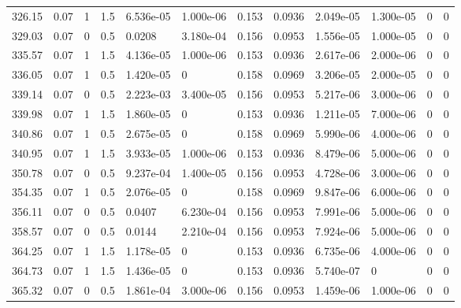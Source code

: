 \documentclass[preview]{standalone}
\begin{document}
{{{\begin{tabular}{L{1.2cm}C{1.2cm} C{0.3cm}C{0.5cm} C{1.4cm}C{1.4cm} C{1.4cm}C{1.4cm} C{1.6cm}C{1.6cm} C{1.6cm}C{1.6cm}}
  326.15  &  0.07  & 1     & 1.5 &  6.536e-05  & 1.000e-06  &  0.153&   0.0936& 2.049e-05 & 1.300e-05   &  0 & 0  \\ 
  329.03  &  0.07  & 0     & 0.5 &  0.0208  & 3.180e-04  &  0.156&   0.0953& 1.556e-05 & 1.000e-05   &  0 & 0  \\ 
  335.57  &  0.07  & 1     & 1.5 &  4.136e-05  & 1.000e-06  &  0.153&   0.0936& 2.617e-06 & 2.000e-06   &  0 & 0  \\ 
  336.05  &  0.07  & 1     & 0.5 &  1.420e-05  & 0  &  0.158&   0.0969& 3.206e-05 & 2.000e-05   &  0 & 0  \\ 
  339.14  &  0.07  & 0     & 0.5 &  2.223e-03  & 3.400e-05  &  0.156&   0.0953& 5.217e-06 & 3.000e-06   &  0 & 0  \\ 
  339.98  &  0.07  & 1     & 1.5 &  1.860e-05  & 0  &  0.153&   0.0936& 1.211e-05 & 7.000e-06   &  0 & 0  \\ 
  340.86  &  0.07  & 1     & 0.5 &  2.675e-05  & 0  &  0.158&   0.0969& 5.990e-06 & 4.000e-06   &  0 & 0  \\ 
  340.95  &  0.07  & 1     & 1.5 &  3.933e-05  & 1.000e-06  &  0.153&   0.0936& 8.479e-06 & 5.000e-06   &  0 & 0  \\ 
  350.78  &  0.07  & 0     & 0.5 &  9.237e-04  & 1.400e-05  &  0.156&   0.0953& 4.728e-06 & 3.000e-06   &  0 & 0  \\ 
  354.35  &  0.07  & 1     & 0.5 &  2.076e-05  & 0  &  0.158&   0.0969& 9.847e-06 & 6.000e-06   &  0 & 0  \\ 
  356.11  &  0.07  & 0     & 0.5 &  0.0407  & 6.230e-04  &  0.156&   0.0953& 7.991e-06 & 5.000e-06   &  0 & 0  \\ 
  358.57  &  0.07  & 0     & 0.5 &  0.0144  & 2.210e-04  &  0.156&   0.0953& 7.924e-06 & 5.000e-06   &  0 & 0  \\ 
  364.25  &  0.07  & 1     & 1.5 &  1.178e-05  & 0  &  0.153&   0.0936& 6.735e-06 & 4.000e-06   &  0 & 0  \\ 
  364.73  &  0.07  & 1     & 1.5 &  1.436e-05  & 0  &  0.153&   0.0936& 5.740e-07 & 0   &  0 & 0  \\ 
  365.32  &  0.07  & 0     & 0.5 &  1.861e-04  & 3.000e-06  &  0.156&   0.0953& 1.459e-06 & 1.000e-06   &  0 & 0  \\ 
\hline 
\end{tabular} 

}}}
\end{document}

